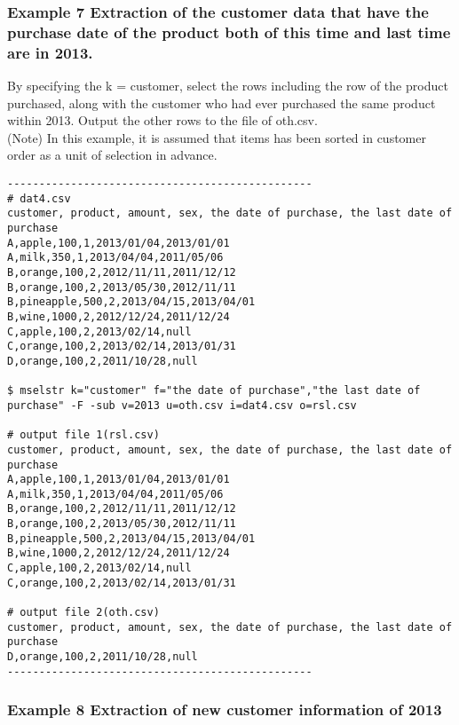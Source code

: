 \documentclass[a4paper]{jarticle}
\begin{document}
\subsubsection*{Example 7 Extraction of the customer data that have the purchase date of the product both of this time and last time are in 2013.}
By specifying the k = customer, select the rows including the row of the product purchased, along with the customer who had ever purchased the same product within 2013. Output the other rows to the file of oth.csv.\\
(Note) In this example, it is assumed that items has been sorted in customer order as a unit of selection in advance.
\begin{verbatim}
------------------------------------------------
# dat4.csv
customer, product, amount, sex, the date of purchase, the last date of purchase
A,apple,100,1,2013/01/04,2013/01/01
A,milk,350,1,2013/04/04,2011/05/06
B,orange,100,2,2012/11/11,2011/12/12
B,orange,100,2,2013/05/30,2012/11/11
B,pineapple,500,2,2013/04/15,2013/04/01
B,wine,1000,2,2012/12/24,2011/12/24
C,apple,100,2,2013/02/14,null
C,orange,100,2,2013/02/14,2013/01/31
D,orange,100,2,2011/10/28,null

$ mselstr k="customer" f="the date of purchase","the last date of purchase" -F -sub v=2013 u=oth.csv i=dat4.csv o=rsl.csv

# output file 1(rsl.csv)
customer, product, amount, sex, the date of purchase, the last date of purchase
A,apple,100,1,2013/01/04,2013/01/01
A,milk,350,1,2013/04/04,2011/05/06
B,orange,100,2,2012/11/11,2011/12/12
B,orange,100,2,2013/05/30,2012/11/11
B,pineapple,500,2,2013/04/15,2013/04/01
B,wine,1000,2,2012/12/24,2011/12/24
C,apple,100,2,2013/02/14,null
C,orange,100,2,2013/02/14,2013/01/31

# output file 2(oth.csv)
customer, product, amount, sex, the date of purchase, the last date of purchase
D,orange,100,2,2011/10/28,null
------------------------------------------------
\end{verbatim}

\subsubsection*{Example 8 Extraction of new customer information of 2013}
\end{document}
